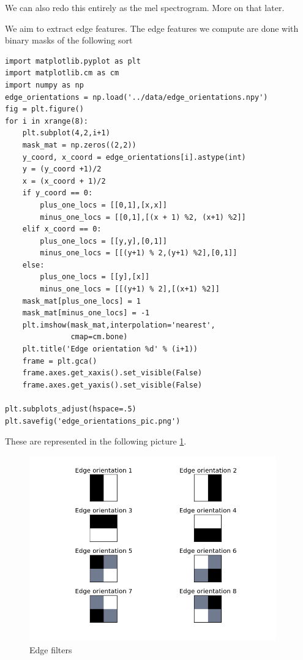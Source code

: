 \documentclass[11pt]{article}
\begin{document}
We can also redo this entirely as the mel spectrogram.  More on that later.

We aim to extract edge features.  The edge features we compute are done
with binary masks of the following sort


\begin{verbatim}
import matplotlib.pyplot as plt
import matplotlib.cm as cm
import numpy as np
edge_orientations = np.load('../data/edge_orientations.npy')
fig = plt.figure()
for i in xrange(8):
    plt.subplot(4,2,i+1)
    mask_mat = np.zeros((2,2))
    y_coord, x_coord = edge_orientations[i].astype(int)
    y = (y_coord +1)/2
    x = (x_coord + 1)/2
    if y_coord == 0:
        plus_one_locs = [[0,1],[x,x]]
        minus_one_locs = [[0,1],[(x + 1) %2, (x+1) %2]]
    elif x_coord == 0:
        plus_one_locs = [[y,y],[0,1]]
        minus_one_locs = [[(y+1) % 2,(y+1) %2],[0,1]]
    else:
        plus_one_locs = [[y],[x]]
        minus_one_locs = [[(y+1) % 2],[(x+1) %2]]
    mask_mat[plus_one_locs] = 1
    mask_mat[minus_one_locs] = -1
    plt.imshow(mask_mat,interpolation='nearest',
               cmap=cm.bone)
    plt.title('Edge orientation %d' % (i+1))
    frame = plt.gca()
    frame.axes.get_xaxis().set_visible(False)
    frame.axes.get_yaxis().set_visible(False)

plt.subplots_adjust(hspace=.5)
plt.savefig('edge_orientations_pic.png')
\end{verbatim}

These are represented in the following picture \ref{fig:edge_orientations}.

\begin{figure}[htb]
\centering
\includegraphics[height=8cm]{./edge_orientations_pic.png}
\caption{\label{fig:edge_orientations}Edge filters}
\end{figure}
\end{document}
